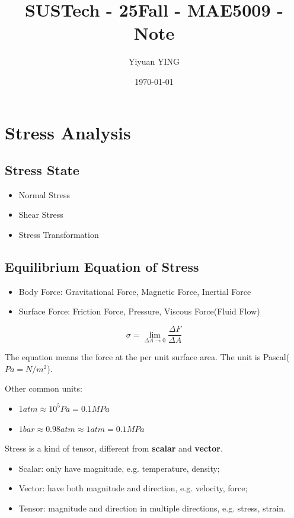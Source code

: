 \documentclass[en,hazy,cyan,8pt,normal]{elegantnote}
\title{SUSTech - 25Fall - MAE5009 - Note}
\author{Yiyuan YING}
\institute{Southern University of Science and Technology}
\date{\today}
\numberwithin{equation}{section}
\begin{document}
\maketitle

\section{Stress Analysis}\label{sec:01}
  \subsection{Stress State}\label{subsec:01.01}
    \begin{itemize}
      \item Normal Stress
      \item Shear Stress
      \item Stress Transformation
    \end{itemize}

  \subsection{Equilibrium Equation of Stress}\label{subsec:01.02}
    \begin{itemize}
      \item Body Force: Gravitational Force, Magnetic Force, Inertial Force
      \item Surface Force: Friction Force, Pressure, Viscous Force(Fluid Flow)
    \end{itemize}

    \begin{equation}\label{eq:001}
      \sigma=\lim_{\Delta A \to 0} \frac{\Delta F}{\Delta A}
    \end{equation}

    The equation means the force at the per unit surface area. The unit is Pascal($Pa=N/m^2$).

    Other common units:
    \begin{itemize}
      \item $1 atm \approx 10^5 Pa = 0.1 MPa$
      \item $1 bar \approx 0.98 atm \approx 1 atm = 0.1 MPa$
    \end{itemize}

    Stress is a kind of tensor, different from \textbf{scalar} and \textbf{vector}.
    \begin{itemize}
      \item Scalar: only have magnitude, e.g. temperature, density;
      \item Vector: have both magnitude and direction, e.g. velocity, force;
      \item Tensor: magnitude and direction in multiple directions, e.g. stress, strain.
    \end{itemize}
\end{document}

